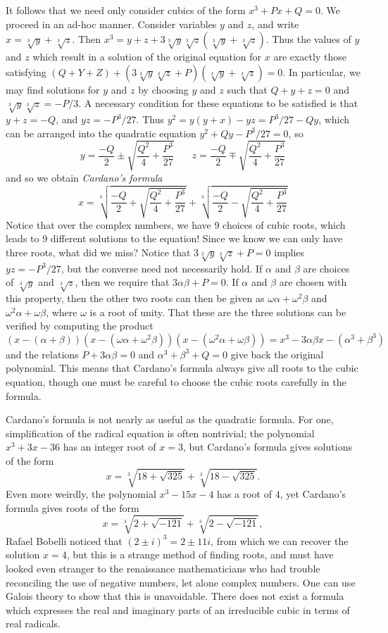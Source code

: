 It follows that we need only consider cubics of the form $x^3 + Px + Q = 0$. We proceed in an ad-hoc manner. Consider variables $y$ and $z$, and write $x = \sqrt[3]{y} + \sqrt[3]{z}$. Then $x^3 = y + z + 3\sqrt[3]{y}\sqrt[3]{z}(\sqrt[3]{y} + \sqrt[3]{z})$. Thus the values of $y$ and $z$ which result in a solution of the original equation for $x$ are exactly those satisfying $(Q + Y + Z) + (3\sqrt[3]{y}\sqrt[3]{z} + P)(\sqrt[3]{y} + \sqrt[3]{z}) = 0$. In particular, we may find solutions for $y$ and $z$ by choosing $y$ and $z$ such that $Q + y + z = 0$ and $\sqrt[3]{y} \sqrt[3]{z} = -P/3$. A necessary condition for these equations to be satisfied is that $y + z = -Q$, and $yz = -P^3/27$. Thus $y^2 = y(y + x) - yz = P^3/27 - Qy$, which can be arranged into the quadratic equation $y^2 + Qy - P^3/27 = 0$, so
%
\[ y = \frac{-Q}{2} \pm \sqrt{\frac{Q^2}{4} + \frac{P^3}{27}}\ \ \ \ \ \ \ \ z = \frac{-Q}{2} \mp \sqrt{\frac{Q^2}{4} + \frac{P^3}{27}} \]
%
and so we obtain \emph{Cardano's formula}
%
\[ x = \sqrt[3]{\frac{-Q}{2} + \sqrt{\frac{Q^2}{4} + \frac{P^3}{27}}} + \sqrt[3]{\frac{-Q}{2} - \sqrt{\frac{Q^2}{4} + \frac{P^3}{27}}} \]
%
Notice that over the complex numbers, we have 9 choices of cubic roots, which leads to 9 different solutions to the equation! Since we know we can only have three roots, what did we miss? Notice that $3\sqrt[3]{y}\sqrt[3]{z} + P = 0$ implies $yz = -P^3/27$, but the converse need not necessarily hold. If $\alpha$ and $\beta$ are choices of $\sqrt[3]{y}$ and $\sqrt[3]{z}$, then we require that $3\alpha\beta + P = 0$. If $\alpha$ and $\beta$ are chosen with this property, then the other two roots can then be given as $\omega \alpha + \omega^2 \beta$ and $\omega^2 \alpha + \omega \beta$, where $\omega$ is a root of unity. That these are the three solutions can be verified by computing the product
%
\[ (x - (\alpha + \beta))(x - (\omega \alpha + \omega^2 \beta)) (x - (\omega^2 \alpha + \omega \beta)) = x^3 - 3\alpha \beta x - (\alpha^3 + \beta^3) \]
%
and the relations $P + 3 \alpha \beta = 0$ and $\alpha^3 + \beta^3 + Q = 0$ give back the original polynomial. This means that Cardano's formula always give all roots to the cubic equation, though one must be careful to choose the cubic roots carefully in the formula.

Cardano's formula is not nearly as useful as the quadratic formula. For one, simplification of the radical equation is often nontrivial; the polynomial $x^3 + 3x - 36$ has an integer root of $x = 3$, but Cardano's formula gives solutions of the form
%
\[ x = \sqrt[3]{18 + \sqrt{325}} + \sqrt[3]{18 - \sqrt{325}}. \]
%
Even more weirdly, the polynomial $x^3 - 15x - 4$ has a root of $4$, yet Cardano's formula gives roots of the form
%
\[ x = \sqrt[3]{2 + \sqrt{-121}} + \sqrt[3]{2 - \sqrt{-121}}, \]
%
Rafael Bobelli noticed that $(2 \pm i)^3 = 2 \pm 11 i$, from which we can recover the solution $x = 4$, but this is a strange method of finding roots, and must have looked even stranger to the renaissance mathematicians who had trouble reconciling the use of negative numbers, let alone complex numbers. One can use Galois theory to show that this is unavoidable. There does not exist a formula which expresses the real and imaginary parts of an irreducible cubic in terms of real radicals.

